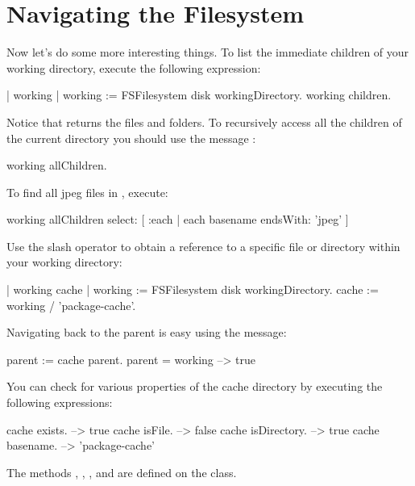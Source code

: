 \documentclass[a4paper,10pt,twoside]{book}
\begin{document}
\section{Navigating the Filesystem}

Now let's do some more interesting things. To list the immediate children of your working directory, execute the following expression:

\begin{code}{}
| working |
working := FSFilesystem disk workingDirectory.
working children.
\end{code} 

Notice that  returns the files and folders. 
To recursively access all the children of the current directory you should use the message :

\begin{code}{}
working allChildren.
\end{code}


To find all jpeg files in , execute:

\begin{code}{}
working allChildren select: [ :each | each basename endsWith: 'jpeg' ]
\end{code} 
 
Use the slash operator to obtain a reference to a specific file or directory within your working directory:

\begin{code}{}
| working cache |
working := FSFilesystem disk workingDirectory.
cache := working / 'package-cache'.
\end{code} 

Navigating back to the parent is easy using the  message:

\begin{code}{}
parent := cache parent.
parent = working			--> true
\end{code}

You can check for various properties of the cache directory by executing the following expressions:

\begin{code}{}
cache exists.				--> true
cache isFile.				--> false
cache isDirectory.			--> true
cache basename.			--> 'package-cache'
\end{code} 
The methods , , , and   are defined on the  class. 
\end{document}
